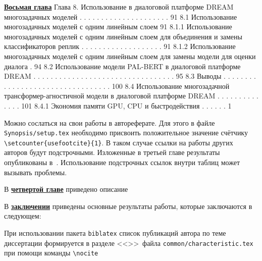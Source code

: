 \underline{\textbf{Восьмая глава}}
Глава 8. Использование в диалоговой платформе DREAM
многозадачных моделей . . . . . . . . . . . . . . . . . . . . . 91
8.1 Использование многозадачных моделей с одним линейным слоем 91
8.1.1 Использование многозадачных моделей с одним
линейным слоем для объединения и замены
классификаторов реплик . . . . . . . . . . . . . . . . . . . 91
8.1.2 Использование многозадачных моделей с одним
линейным слоем для замены модели для оценки диалога . 94
8.2 Использование модели PAL-BERT в диалоговой платформе
DREAM . . . . . . . . . . . . . . . . . . . . . . . . . . . . . . . . . 95
8.3 Выводы . . . . . . . . . . . . . . . . . . . . . . . . . . . . . . . . . 100
8.4 Использование многозадачной трансформер-агностичной
модели в диалоговой платформе DREAM . . . . . . . . . . . . . . 101
8.4.1 Экономия памяти GPU, CPU и быстродействия . . . . . . 1

Можно сослаться на свои работы в автореферате. Для этого в файле
\verb!Synopsis/setup.tex! необходимо присвоить положительное значение
счётчику \verb!\setcounter{usefootcite}{1}!. В таком случае ссылки на
работы других авторов будут подстрочными.
Изложенные в третьей главе результаты опубликованы в~\cite{vakbib1, vakbib2}.
Использование подстрочных ссылок внутри таблиц может вызывать проблемы.

В \underline{\textbf{четвертой главе}} приведено описание

В \underline{\textbf{заключении}} приведены основные результаты работы, которые заключаются в следующем:


При использовании пакета \verb!biblatex! список публикаций автора по теме
диссертации формируется в разделе <<\publications>>\ файла
\verb!common/characteristic.tex!  при помощи команды \verb!\nocite!

